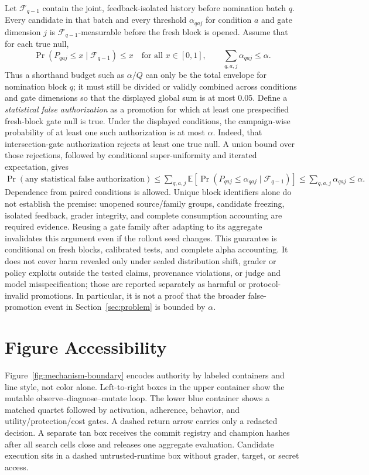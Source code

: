 Let \(\mathcal F_{q-1}\) contain the joint, feedback-isolated history before
nomination batch \(q\).  Every candidate in that batch and every threshold
\(\alpha_{qaj}\) for condition \(a\) and gate dimension \(j\) is
\(\mathcal F_{q-1}\)-measurable before the fresh block is opened.  Assume that
for each true null,
\[
  \Pr(P_{qaj}\leq x\mid\mathcal F_{q-1})\leq x
  \quad\text{for all }x\in[0,1],
  \qquad
  \sum_{q,a,j}\alpha_{qaj}\leq\alpha.
\]
Thus a shorthand budget such as \(\alpha/Q\) can only be the total envelope
for nomination block \(q\); it must still be divided or validly combined across
conditions and gate dimensions so that the displayed global sum is at most
0.05.
Define a \emph{statistical false authorization} as a promotion for which at
least one prespecified fresh-block gate null is true.  Under the displayed
conditions, the campaign-wise probability of at least one such authorization
is at most \(\alpha\).  Indeed, that intersection-gate authorization rejects at
least one true null.  A union bound over those rejections, followed by
conditional super-uniformity and iterated expectation, gives
\(
  \Pr(\text{any statistical false authorization})
  \leq\sum_{q,a,j}\mathbb E[
  \Pr(P_{qaj}\leq\alpha_{qaj}\mid\mathcal F_{q-1})]
  \leq\sum_{q,a,j}\alpha_{qaj}\leq\alpha.
\)
Dependence from paired conditions is allowed.  Unique block identifiers alone
do not establish the premise: unopened source/family groups, candidate freezing,
isolated feedback, grader integrity, and complete consumption accounting are
required evidence.  Reusing a gate family after adapting to its aggregate
invalidates this argument even if the rollout seed changes.  This guarantee is
conditional on fresh blocks, calibrated tests, and complete alpha accounting.
It does not cover harm revealed only under sealed distribution shift, grader or
policy exploits outside the tested claims, provenance violations, or judge and
model misspecification; those are reported separately as harmful or protocol-
invalid promotions.  In particular, it is not a proof that the broader false-
promotion event in Section~\ref{sec:problem} is bounded by \(\alpha\).

\section{Figure Accessibility}
\label{app:figure-accessibility}

Figure~\ref{fig:mechanism-boundary} encodes authority by labeled containers and
line style, not color alone.  Left-to-right boxes in the upper container show
the mutable observe--diagnose--mutate loop.  The lower blue container shows a
matched quartet followed by activation, adherence, behavior, and
utility/protection/cost gates.  A dashed return arrow carries only a redacted
decision.  A separate tan box receives the commit registry and champion hashes
after all search cells close and releases one aggregate evaluation.  Candidate execution sits in a
dashed untrusted-runtime box without grader, target, or secret access.

